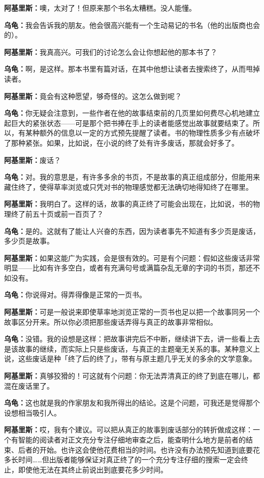 \documentclass[
  12pt,
  twoside,
  openright,
  oldfontcommands,
]{memoir}
\newcommand{\dialogname}[1]{{\heifamily\bfseries #1}}
\begin{document}
\dialogname{阿基里斯：}噢，太对了！但原来那个书名太糟糕。没人能懂。

\dialogname{乌龟：}我会告诉我的朋友。他会很高兴能有一个生动易记的书名（他的出版商也会的）。

\dialogname{阿基里斯：}我真高兴。可我们的讨论怎么会让你想起他的那本书了？

\dialogname{乌龟：}啊，是这样。那本书里有篇对话，在其中他想让读者去搜索终了，从而甩掉读者。

\dialogname{阿基里斯：}竟会有这种愿望，够奇怪的。这怎么做到呢？

\dialogname{乌龟：}你无疑会注意到，一些作者在他的故事结束前的几页里如何费尽心机地建立起巨大的紧张状态------可是那个把书捧在手上的读者能感觉出故事就要结束了。所以，有某种额外的信息以一定的方式预先提醒了读者。书的物理性质多少有点破坏了那种紧张。如果，比如说，在小说的终了处有许多废话，那就会好多了。

\dialogname{阿基里斯：}废话？

\dialogname{乌龟：}对。我的意思是，有许多多余的书页，不是故事的真正组成部分，但能用来藏住终了，使得草率浏览或只凭对书的物理感觉都无法确切地得知终了在哪里。

\dialogname{阿基里斯：}我明白了。这样的话，故事的真正终了可能会出现在，比如说，书的物理终了前五十页或前一百页了？

\dialogname{乌龟：}是的。这就有了能让人兴奋的东西，因为读者事先不知道有多少页是废话，多少页是故事。

\dialogname{阿基里斯：}如果这能广为实践，会是很有效的。可是有个问题：假如这些废话非常明显------比如有许多空白，或者有充满句号或满篇杂乱无章的字词的书页，那还不如没有。

\dialogname{乌龟：}你说得对。得弄得像是正常的一页书。

\dialogname{阿基里斯：}可是一般说来即使草率地浏览正常的一页书也足以把一个故事同另一个故事区分开来。所以你必须把那些废话弄得与真正的故事非常相似。

\dialogname{乌龟：}没错。我的设想是这样：把故事讲完后不中断，继续讲下去，讲一些看上去是该故事的继续，而实际上只是些废话，与真正的主题毫无关系的事。某种意义上说，这些废话是种「终了后的终了」，带有与原主题几乎无关的多余的文学意象。

\dialogname{阿基里斯：}真够狡猾的！可这就有个问题：你无法弄清真正的终了到底在哪儿，都混在废话里了。

\dialogname{乌龟：}这也就是我的作家朋友和我所得出的结论。这是个问题，可我还是觉得那个设想相当吸引人。

\dialogname{阿基里斯：}哎，我有个建议。可以把从真正的故事到废话部分的转折做成这样：一个有智能的阅读者对正文充分专注仔细地审查之后，能查明什么地方是前者的结束、后者的开始。也许这会使他花费相当的时间。也许没有办法预先知道到底要花多长时间\ldots\ldots 但出版者能够保证对真正终了的一个充分专注仔细的搜索一定会终止，即使他无法在其终止前说出到底要花多少时间。
\end{document}
